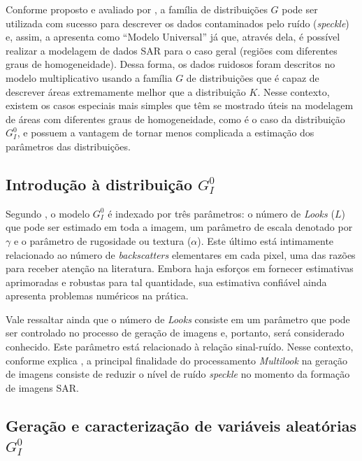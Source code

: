 Conforme proposto e avaliado por \citet{Clutter1997}, a família de distribuições $G$ pode ser utilizada com sucesso para descrever os dados contaminados pelo ruído (\textit{speckle}) e, assim, a apresenta como ``Modelo Universal'' já que, através dela, é possível realizar a modelagem de dados SAR para o caso geral (regiões com diferentes graus de homogeneidade). 
Dessa forma, os dados ruidosos foram descritos no modelo multiplicativo usando a família $G$ de distribuições que é capaz de descrever áreas extremamente  melhor que a distribuição $K$.
Nesse contexto, existem os casos especiais mais simples que têm se mostrado úteis na modelagem de áreas com diferentes graus de homogeneidade, como é o caso da distribuição $G_I^0$, e possuem a vantagem de tornar menos complicada a estimação dos parâmetros das distribuições. 


\subsection{Introdução à distribuição $G_I^0$}

Segundo \citet{FreryStochasticDistances2015}, o modelo $G_I^0$ é indexado por três parâmetros: o número de \textit{Looks} ($L$) que pode ser estimado em toda a imagem, um parâmetro de escala denotado por $\gamma$ e o parâmetro de rugosidade ou textura ($\alpha$). 
Este último está intimamente relacionado ao número de \textit{backscatters} elementares em cada pixel, uma das razões para receber atenção na literatura. 
Embora haja esforços em fornecer estimativas aprimoradas e robustas para tal quantidade, sua estimativa confiável ainda apresenta problemas numéricos na prática.

Vale ressaltar ainda que o número de \textit{Looks} consiste em um parâmetro que pode ser controlado no processo de geração de imagens e, portanto, será considerado conhecido. 
Este parâmetro está relacionado à relação sinal-ruído. 
Nesse contexto, conforme explica \citet{dissert_torres}, a principal finalidade do processamento \textit{Multilook} na geração de imagens consiste de reduzir o nível de ruído \textit{speckle} no momento da formação de imagens SAR. 

\subsection{Geração e caracterização de variáveis aleatórias $G_I^0$}


